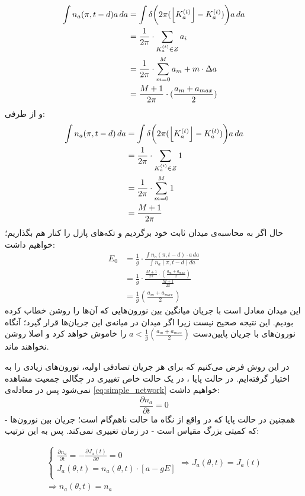 \begin{align}
	\int n_a(\pi,t-d)a\,da &= \int \delta \bigg( 2\pi ( \left\lfloor K^{(t)}_a \right\rfloor - K^{(t)}_a) \bigg) a\,da\\
	&= \frac{1}{2\pi} \cdot \sum_{K^{(t)}_a \in Z} a_i \\
	&= \frac{1}{2\pi} \cdot \sum^{M}_{m=0} a_m + m \cdot \Delta a\\
	&= \frac{M+1}{2\pi} \cdot ( \frac{a_m +a_{max} }{2} )\\
\end{align}
و از طرفی:
\begin{align}
	\int n_a(\pi,t-d)\,da &= \int \delta \bigg( 2\pi ( \left\lfloor K^{(t)}_a \right\rfloor - K^{(t)}_a) \bigg) a\,da\\
	&= \frac{1}{2\pi} \cdot \sum_{K^{(t)}_a \in Z} 1 \\
	&= \frac{1}{2\pi} \cdot \sum^{M}_{m=0}  1\\
	&= \frac{M+1}{2\pi}
\end{align}
حال اگر به محاسبه‌ی میدان ثابت خود برگردیم و تکه‌های پازل را کنار هم بگذاریم؛ خواهیم داشت:
\begin{align}
	E_0 &= \frac{1}{g}\cdot \frac{\int n_a(\pi,t-d)\cdot a\,da}{\int n_a(\pi,t-d) da } \\
	&= \frac{1}{g}\cdot \frac{ \frac{M+1}{2\pi} \cdot ( \frac{a_m +a_{max} }{2} ) }{ \frac{M+1}{2\pi} } \\
	&= \frac{1}{g} ( \frac{a_m +a_{max} }{2} )
\end{align}
این میدان معادل است با جریان میانگین بین نورون‌هایی که آن‌ها را روشن خطاب کرده بودیم. این نتیجه صحیح نیست زیرا اگر میدان در میانه‌ی این جریان‌ها قرار گیرد؛ آنگاه نورون‌های با جریان پایین‌دست 
$a < \frac{1}{g} ( \frac{a_m +a_{max} }{2} ) $
را خاموش خواهد کرد و اصلا روشن نخواهند ماند.

در این روش فرض می‌کنیم که برای هر جریان تصادفی اولیه، نورون‌های زیادی را به اختیار گرفته‌ایم. در حالت پایا  ، در یک حالت خاص تغییری در چگالی جمعیت مشاهده نمی‌شود پس در معادله‌ی
\ref{eq:simple_network}
خواهیم داشت:
\begin{equation}
	\frac{\partial n_a}{\partial t} = 0
\end{equation}
همچنین در حالت پایا که در واقع از نگاه ما حالت ناهم‌گام است؛ جریان بین نورون‌ها - که کمیتی بزرگ مقیاس است -  در زمان تغییری نمی‌کند. پس به این ترتیب:

\begin{align}
	\begin{cases}
		\frac{\partial n_a}{\partial t} = - \frac{\partial J_{a}(t)}{\partial \theta} = 0\\
		J_{a}(\theta, t) = n_a(\theta,t) \cdot [ a - g E ]\\
	\end{cases}
	\Rightarrow J_{a}(\theta, t) = J_{a}(t)\\
	\Rightarrow n_{a}(\theta, t) = n_{a}\\
\end{align}


